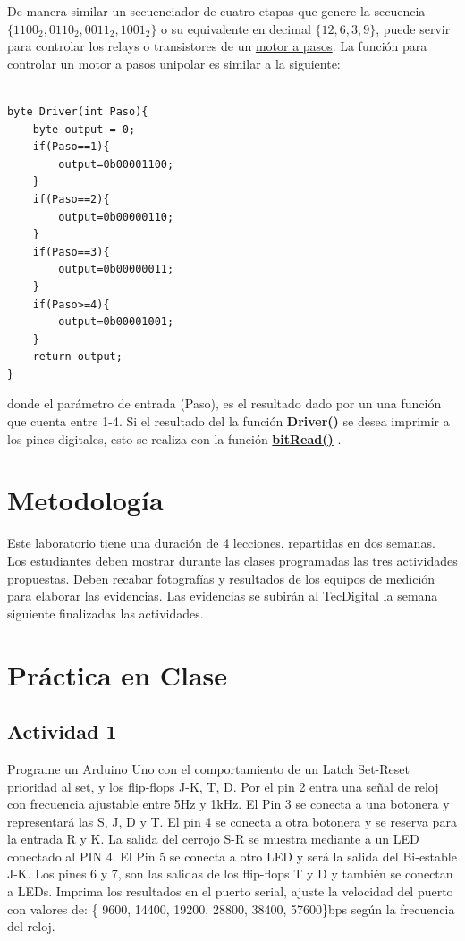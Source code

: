 De manera similar un secuenciador de cuatro etapas que genere la secuencia $\{1100_{2}, 0110_{2}, 0011_{2}, 1001_{2}\}$ o su equivalente en decimal    $\{12,6,3,9\}$, puede servir para controlar los relays o transistores de un \href{https://es.wikipedia.org/wiki/Motor_paso_a_paso}{motor a pasos}. La función para controlar un motor a pasos unipolar es similar a la siguiente:


\begin{lstlisting}[language=Arduino,numbers=none, showstringspaces=false]

byte Driver(int Paso){
	byte output = 0;
	if(Paso==1){
		output=0b00001100; 
	}
	if(Paso==2){
		output=0b00000110;
	}
	if(Paso==3){
		output=0b00000011;
	}
	if(Paso>=4){
		output=0b00001001;
	}
	return output;
}
\end{lstlisting} donde el parámetro de entrada (Paso), es el resultado dado por un una función que cuenta entre {1-4}. Si el resultado del la función \textbf{Driver()} se desea imprimir a los pines digitales, esto se realiza con la función \href{https://www.arduino.cc/reference/en/language/functions/bits-and-bytes/bitread/}{\textbf{bitRead()}} .
  
\section{Metodología}

Este laboratorio tiene una duración de 4 lecciones, repartidas en dos semanas. Los estudiantes deben mostrar durante las clases programadas las tres actividades propuestas. Deben recabar fotografías y resultados de los equipos de medición para elaborar las evidencias. Las evidencias se subirán al TecDigital la semana siguiente finalizadas las actividades.

\section{Práctica en Clase}

\subsection{Actividad 1}

Programe un Arduino Uno con el comportamiento de un Latch Set-Reset prioridad al set, y los flip-flops J-K, T, D.  Por el pin 2 entra una señal de reloj con frecuencia ajustable entre 5Hz y 1kHz. El Pin 3  se conecta a una botonera y representar\'a las  S, J, D y T.  El pin 4 se conecta a otra botonera y se  reserva para la entrada R y K. La salida del cerrojo S-R se muestra mediante a un LED conectado al PIN 4. El Pin 5 se conecta a otro LED y será la salida del Bi-estable J-K. Los pines 6 y 7, son las salidas de los flip-flops T y D y también se conectan a LEDs. Imprima los resultados en el puerto serial, ajuste la velocidad del puerto con valores de: \{ 9600, 14400, 19200, 28800, 38400, 57600\}bps según la frecuencia del reloj.
 
